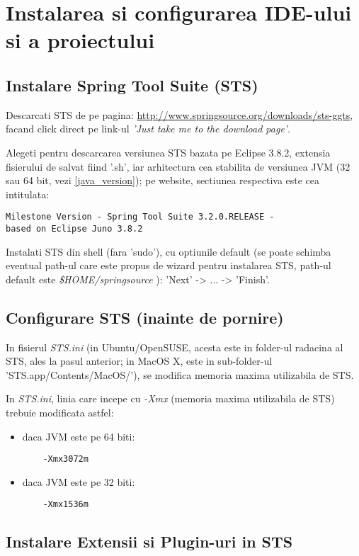 \section{Instalarea si configurarea IDE-ului si a proiectului}

\subsection{Instalare Spring Tool Suite (STS)}
Descarcati STS de pe pagina:
\url{http://www.springsource.org/downloads/sts-ggts},
facand click direct pe link-ul \emph{'Just take me to the download page'}.

Alegeti pentru descarcarea versiunea STS bazata pe Eclipse 3.8.2, extensia
fisierului de salvat fiind '.sh', iar arhitectura cea stabilita de versiunea
JVM (32 sau 64 bit, vezi \ref{java_version}); pe website, sectiunea respectiva
este cea intitulata:
\begin{verbatim}
Milestone Version - Spring Tool Suite 3.2.0.RELEASE - 
based on Eclipse Juno 3.8.2
\end{verbatim}

Instalati STS din shell (fara 'sudo'), cu optiunile default (se poate
schimba eventual path-ul care este propus de wizard pentru instalarea STS,
path-ul default este \emph{\$HOME/springsource} ):
'Next' -> ... -> 'Finish'.

\subsection{Configurare STS (inainte de pornire)}
In fisierul \emph{STS.ini} (in Ubuntu/OpenSUSE, acesta este in folder-ul
radacina al STS, ales la pasul anterior; in MacOS X, este in sub-folder-ul
'STS.app/Contents/MacOS/'), se modifica memoria maxima utilizabila de STS.

In \emph{STS.ini}, linia care incepe cu \emph{-Xmx} (memoria maxima utilizabila
de STS) trebuie modificata astfel:
\begin{itemize} 
\item daca JVM este pe 64 biti:
\begin{lstlisting}
	-Xmx3072m
\end{lstlisting}
\item daca JVM este pe 32 biti:
\begin{lstlisting}
	-Xmx1536m
\end{lstlisting}
\end{itemize}

\subsection{Instalare Extensii si Plugin-uri in STS}

